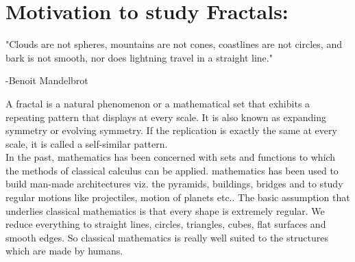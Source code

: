 \documentclass[14pt]{extarticle}
\begin{document}
\newpage

\tableofcontents

\newpage 

\section*{\LARGE Motivation to study Fractals:}
"Clouds are not spheres, mountains are not cones, coastlines are not circles, and bark is not smooth, nor does lightning travel in a straight line."\\
\begin{flushright}
-Benoit Mandelbrot
\end{flushright}

A fractal is a natural phenomenon or a mathematical set that exhibits a repeating pattern that displays at every scale. It is also known as expanding symmetry or evolving symmetry. If the replication is exactly the same at every scale, it is called a self-similar pattern.\\
In the past, mathematics has been concerned with sets and functions to which the methods of classical calculus can be applied. mathematics has been used to build man-made architectures viz. the pyramids, buildings, bridges and to study regular motions like projectiles, motion of planets etc.. The basic assumption that underlies classical mathematics is that every shape is extremely regular. We reduce everything to straight lines, circles, triangles, cubes, flat surfaces and smooth edges. So classical mathematics is really well suited to the structures which are made by humans.

\newpage 
\end{document}
